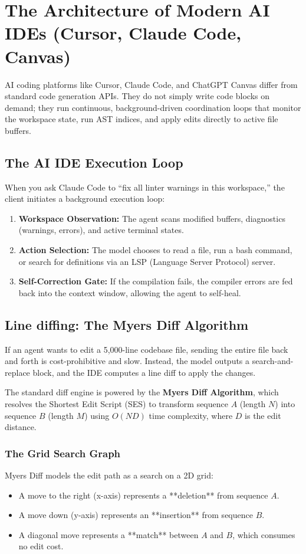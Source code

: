 \chapter{The Architecture of Modern AI IDEs (Cursor, Claude Code, Canvas)}

AI coding platforms like Cursor, Claude Code, and ChatGPT Canvas differ from standard code generation APIs. They do not simply write code blocks on demand; they run continuous, background-driven coordination loops that monitor the workspace state, run AST indices, and apply edits directly to active file buffers.

\section{The AI IDE Execution Loop}

When you ask Claude Code to ``fix all linter warnings in this workspace,'' the client initiates a background execution loop:
\begin{enumerate}
    \item \textbf{Workspace Observation:} The agent scans modified buffers, diagnostics (warnings, errors), and active terminal states.
    \item \textbf{Action Selection:} The model chooses to read a file, run a bash command, or search for definitions via an LSP (Language Server Protocol) server.
    \item \textbf{Self-Correction Gate:} If the compilation fails, the compiler errors are fed back into the context window, allowing the agent to self-heal.
\end{enumerate}

\section{Line diffing: The Myers Diff Algorithm}

If an agent wants to edit a 5,000-line codebase file, sending the entire file back and forth is cost-prohibitive and slow. Instead, the model outputs a search-and-replace block, and the IDE computes a line diff to apply the changes.

The standard diff engine is powered by the \textbf{Myers Diff Algorithm}, which resolves the Shortest Edit Script (SES) to transform sequence $A$ (length $N$) into sequence $B$ (length $M$) using $O(ND)$ time complexity, where $D$ is the edit distance.

\subsection{The Grid Search Graph}
Myers Diff models the edit path as a search on a 2D grid:
\begin{itemize}
    \item A move to the right (x-axis) represents a **deletion** from sequence $A$.
    \item A move down (y-axis) represents an **insertion** from sequence $B$.
    \item A diagonal move represents a **match** between $A$ and $B$, which consumes no edit cost.
\end{itemize}

